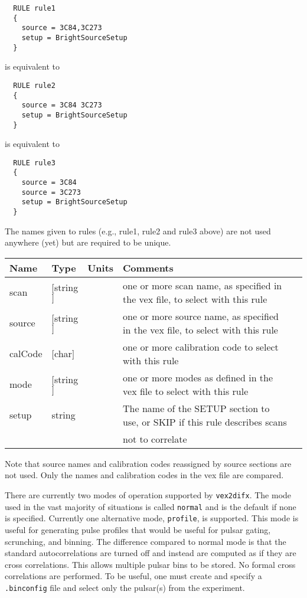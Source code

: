 \begin{verbatim}
  RULE rule1
  {
    source = 3C84,3C273
    setup = BrightSourceSetup
  }
\end{verbatim}

\noindent
is equivalent to

\begin{verbatim}
  RULE rule2
  {
    source = 3C84 3C273
    setup = BrightSourceSetup
  }
\end{verbatim}

\noindent
is equivalent to

\begin{verbatim}
  RULE rule3
  {
    source = 3C84
    source = 3C273
    setup = BrightSourceSetup
  }
\end{verbatim}

The names given to rules (e.g., rule1, rule2 and rule3 above) are not used anywhere (yet) but are required to be unique.

\begin{center}
\begin{tabular}{l l l l l}
\hline
Name	& Type		& Units	& Comments \\
\hline
scan	& $[$string$]$	&	& one or more scan name, as specified in the vex file, to select with this rule \\
source	& $[$string$]$	&	& one or more source name, as specified in the vex file, to select with this rule \\
calCode	& $[$char$]$	&	& one or more calibration code to select with this rule \\
mode	& $[$string$]$	&	& one or more modes as defined in the vex file to select with this rule \\
setup	& string	&	& The name of the SETUP section to use, or SKIP if this rule describes scans \\
	&		&	& not to correlate \\
\hline
\hline
\end{tabular}
\end{center}

Note that source names and calibration codes reassigned by source sections are not used.
Only the names and calibration codes in the vex file are compared.

There are currently two modes of operation supported by {\tt vex2difx}.  
The mode used in the vast majority of situations is called {\tt normal} and is the default if none is specified.
Currently one alternative mode, {\tt profile}, is supported.
This mode is useful for generating pulse profiles that would be useful for pulsar gating, scrunching, and binning.
The difference compared to normal mode is that the standard autocorrelations are turned off and instead are computed as if they are cross correlations.
This allows multiple pulsar bins to be stored. 
No formal cross correlations are performed. 
To be useful, one must create and specify a {\tt .binconfig} file and select only the pulsar(s) from the experiment.

